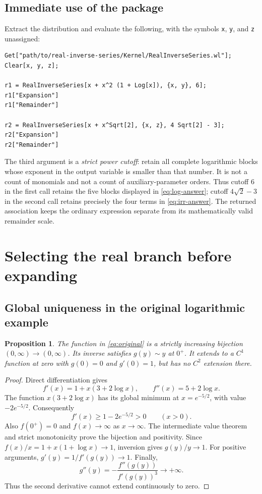 \documentclass[11pt,a4paper]{article}
\numberwithin{equation}{section}
\newtheorem{proposition}[theorem]{Proposition}
\theoremstyle{definition}
\newcommand{\code}[1]{\texttt{#1}}
\begin{document}
\subsection{Immediate use of the package}
Extract the distribution and evaluate the following, with the symbols
\code{x}, \code{y}, and \code{z} unassigned:
\begin{lstlisting}
Get["path/to/real-inverse-series/Kernel/RealInverseSeries.wl"];
Clear[x, y, z];

r1 = RealInverseSeries[x + x^2 (1 + Log[x]), {x, y}, 6];
r1["Expansion"]
r1["Remainder"]

r2 = RealInverseSeries[x + x^Sqrt[2], {x, z}, 4 Sqrt[2] - 3];
r2["Expansion"]
r2["Remainder"]
\end{lstlisting}
The third argument is a \emph{strict power cutoff}: retain all complete
logarithmic blocks whose exponent in the output variable is smaller than
that number. It is not a count of monomials and not a count of
auxiliary-parameter orders. Thus cutoff $6$ in the first call retains the
five blocks displayed in \eqref{eq:log-answer}; cutoff $4\sqrt2-3$ in the
second call retains precisely the four terms in \eqref{eq:irr-answer}.
The returned association keeps the ordinary expression separate from its
mathematically valid remainder scale.

\section{Selecting the real branch before expanding}
\label{sec:branch}

\subsection{Global uniqueness in the original logarithmic example}
\begin{proposition}\label{prop:global-log}
The function in \eqref{eq:original} is a strictly increasing bijection
$(0,\infty)\to(0,\infty)$. Its inverse satisfies $g(y)\sim y$ at $0^+$.
It extends to a $C^1$ function at zero with $g(0)=0$ and $g'(0)=1$, but
has no $C^2$ extension there.
\end{proposition}
\begin{proof}
Direct differentiation gives
\[
 f'(x)=1+x(3+2\log x),\qquad f''(x)=5+2\log x.
\]
The function $x(3+2\log x)$ has its global minimum at
$x=e^{-5/2}$, with value $-2e^{-5/2}$. Consequently
\[
 f'(x)\ge 1-2e^{-5/2}>0\qquad(x>0).
\]
Also $f(0^+)=0$ and $f(x)\to\infty$ as $x\to\infty$. The intermediate
value theorem and strict monotonicity prove the bijection and positivity.
Since $f(x)/x=1+x(1+\log x)\to1$, inversion gives $g(y)/y\to1$.
For positive arguments, $g'(y)=1/f'(g(y))\to1$. Finally,
\[
 g''(y)=-\frac{f''(g(y))}{f'(g(y))^3}\longrightarrow+\infty.
\]
Thus the second derivative cannot extend continuously to zero.
\end{proof}
\end{document}
